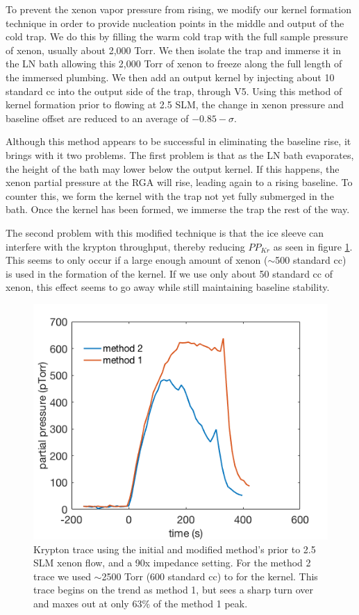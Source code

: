 To prevent the xenon vapor pressure from rising, we modify our kernel formation technique in order to provide nucleation points in the middle and output of the cold trap. We do this by filling the warm cold trap with the full sample pressure of xenon, usually about 2,000 Torr. We then isolate the trap and immerse it in the LN bath allowing this 2,000 Torr of xenon to freeze along the full length of the immersed plumbing. We then add an output kernel by injecting about 10 standard cc into the output side of the trap, through V5. Using this method of kernel formation prior to flowing at 2.5 SLM, the change in xenon pressure and baseline offset are reduced to an average of $-0.85-\sigma$. 

Although this method appears to be successful in eliminating the baseline rise, it brings with it two problems. The first problem is that as the LN bath evaporates, the height of the bath may lower below the output kernel. If this happens, the xenon partial pressure at the RGA will rise, leading again to a rising baseline. To counter this, we form the kernel with the trap not yet fully submerged in the bath. Once the kernel has been formed, we immerse the trap the rest of the way.

The second problem with this modified technique is that the ice sleeve can interfere with the krypton throughput, thereby reducing $PP_{Kr}$ as seen in figure \ref{fig:iceformkrloss}. This seems to only occur if a large enough amount of xenon ($\sim$500 standard cc) is used in the formation of the kernel. If we use only about 50 standard cc of xenon, this effect seems to go away while still maintaining baseline stability. 
\begin{figure}[h!]
\centering
\includegraphics[width=\textwidth]{Figures/ice_form_Krloss.png}
\caption{Krypton trace using the initial and modified method's prior to 2.5 SLM xenon flow, and a 90x impedance setting. For the method 2 trace we used $\sim$2500 Torr (600 standard cc) to for the kernel. This trace begins on the trend as method 1, but sees a sharp turn over and maxes out at only 63\% of the method 1 peak. } 
\label{fig:iceformkrloss}
\end{figure} 


